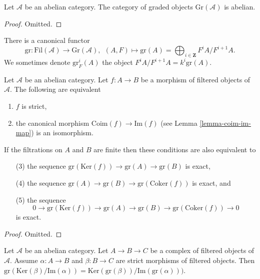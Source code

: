 \begin{lemma}
\label{lemma-graded}
Let $\mathcal{A}$ be an abelian category.
The category of graded objects $\text{Gr}(\mathcal{A})$
is abelian.
\end{lemma}

\begin{proof}
Omitted.
\end{proof}

\noindent
There is a canonical functor
$$
\text{gr} :
\text{Fil}(\mathcal{A})
\longrightarrow
\text{Gr}(\mathcal{A}), \ \ 
(A, F)
\mapsto
\text{gr}(A) =
\bigoplus\nolimits_{i \in \mathbf{Z}} F^iA/F^{i + 1}A.
$$
We sometimes denote $\text{gr}^i_F(A)$ the object
$F^iA/F^{i + 1}A = k^i\text{gr}(A)$.

\begin{lemma}
\label{lemma-characterize-strict}
Let $\mathcal{A}$ be an abelian category.
Let $f : A \to B$ be a morphism of filtered objects of $\mathcal{A}$.
The following are equivalent
\begin{enumerate}
\item $f$ is strict,
\item the canonical morphism $\text{Coim}(f) \to \text{Im}(f)$
(see Lemma \ref{lemma-coim-im-map}) is an isomorphism.
\end{enumerate}
If the filtrations on $A$ and $B$ are finite then these conditions
are also equivalent to
\begin{enumerate}
\item[(3)] the sequence
$\text{gr}(\text{Ker}(f)) \to \text{gr}(A) \to \text{gr}(B)$
is exact,
\item[(4)] the sequence $\text{gr}(A) \to \text{gr}(B) \to
\text{gr}(\text{Coker}(f))$ is exact, and
\item[(5)] the sequence
$$
0 \to
\text{gr}(\text{Ker}(f)) \to
\text{gr}(A) \to
\text{gr}(B) \to
\text{gr}(\text{Coker}(f)) \to 0
$$
is exact.
\end{enumerate}
\end{lemma}

\begin{proof}
Omitted.
\end{proof}

\begin{lemma}
\label{lemma-filtered-complex}
Let $\mathcal{A}$ be an abelian category. Let $A \to B \to C$ be a complex
of filtered objects of $\mathcal{A}$. Assume $\alpha : A \to B$ and
$\beta : B \to C$ are strict morphisms of filtered objects. Then
$\text{gr}(\text{Ker}(\beta)/\text{Im}(\alpha)) =
\text{Ker}(\text{gr}(\beta))/\text{Im}(\text{gr}(\alpha)))$.
\end{lemma}

